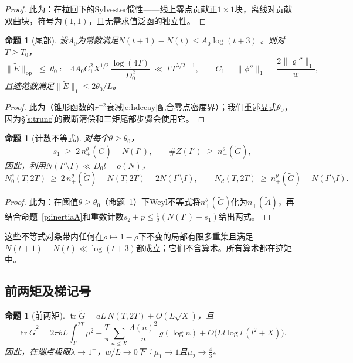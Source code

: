 \documentclass[11pt]{article}
\numberwithin{equation}{section}
\newtheorem{proposition}[theorem]{命题}
\theoremstyle{definition}
\theoremstyle{remark}
\newcommand{\LL}{\Lambda}
\begin{document}
\begin{proof}
此为\cite[命题4.1]{C26}：在拉回下的Sylvester惯性——线上零点贡献正$1\times1$块，离线对贡献双曲块，符号为$(1,1)$，且无需求值泛函的独立性。
\end{proof}

\begin{proposition}[尾部]\label{p:tail}
设$A_0$为常数满足$N(t+1)-N(t)\le A_0\log(t+3)$ \cite[定理9.2]{Tit86}。则对$T\ge T_0$，
\[
\|\widetilde E\|_{\mathrm{op}}\;\le\;\theta_0
:=4A_0C_1^{2}X^{1/2}\,\frac{\log(4T)}{D_0^{2}}
\;\ll\;l\,T^{\lambda/2-1},
\qquad C_1=\|\phi''\|_1=\frac{2\|\varrho''\|_1}{w},
\]
且迹范数满足$\|\widetilde E\|_1\le2\theta_0/L$。
\end{proposition}

\begin{proof}
此为\cite[命题4.2]{C26}（锥形函数的$r^{-2}$衰减\eqref{e:hdecay}配合零点密度界）；我们重述显式$\theta_0$，因为\S\ref{s:trunc}的截断清偿和三矩尾部步骤会使用它。
\end{proof}

\begin{proposition}[计数不等式]\label{p:count}
对每个$\theta\ge\theta_0$，
\[
s_1\;\ge\;2\,n_+^{\theta}(\widetilde G)-N(I'),
\qquad
\#Z(I')\;\ge\;n_+^{\theta}(\widetilde G),
\]
因此，利用$N(I'\setminus I)\ll D_0l=o(N)$，
\begin{equation}\label{e:count}
N_0^{s}(T,2T)\ \ge\ 2\,n_+^{\theta}(\widetilde G)
-N(T,2T)-2N(I'\setminus I),
\qquad
N_d(T,2T)\ \ge\ n_+^{\theta}(\widetilde G)
-N(I'\setminus I).
\end{equation}
\end{proposition}

\begin{proof}
此为\cite[命题4.5]{C26}：在阈值$\theta\ge\theta_0$（命题~\ref{p:tail}）下Weyl不等式将$n_+^{\theta}(\widetilde G)$化为$n_+(\widetilde A)$，再结合命题~\ref{p:inertiaA}和重数计数$s_2+p\le\tfrac12(N(I')-s_1)$给出两式。
\end{proof}

这些不等式对条带内任何在$\rho\mapsto1-\bar\rho$下不变的局部有限多重集且满足$N(t+1)-N(t)\ll\log(t+3)$都成立；它们不含算术。所有算术都在迹矩中。

\subsection{前两矩及梯记号}\label{s:frame:moments}

\begin{proposition}[前两矩]\label{p:mu12}
$\operatorname{tr}\widetilde G=aL\,N(T,2T)+O(L\sqrt X)$，且
\[
\operatorname{tr}\widetilde G^{2}
=2\pi bL\int_T^{2T}\mu^{2}
+\frac{T}{\pi}\sum_{n\le X}\frac{\LL(n)^{2}}{n}\,
g(\log n)+O\bigl(Ll\log l\,(l^{2}+X)\bigr).
\]
因此，在端点极限$\lambda\to1^-$，$w/L\to0$下：$\mu_1\to1$且$\mu_2\to\tfrac43$。
\end{proposition}
\end{document}

